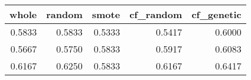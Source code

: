 \begin{tabular}{rrrrr}
\toprule
 whole &  random &  smote &  cf\_random &  cf\_genetic \\
\midrule
0.5833 &  0.5833 & 0.5333 &     0.5417 &      0.6000 \\
0.5667 &  0.5750 & 0.5833 &     0.5917 &      0.6083 \\
0.6167 &  0.6250 & 0.5833 &     0.6167 &      0.6417 \\
\bottomrule
\end{tabular}
